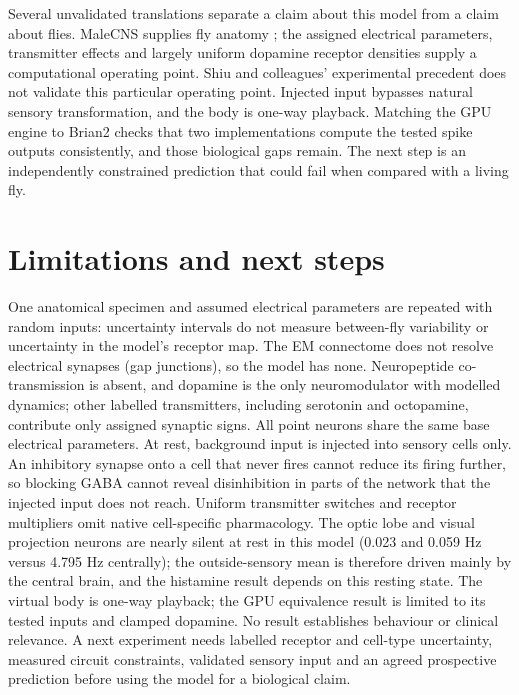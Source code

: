 \documentclass[11pt]{article}
\begin{document}
Several unvalidated translations separate a claim about this model from a claim about flies. MaleCNS supplies fly anatomy \cite{berg}; the assigned electrical parameters, transmitter effects and largely uniform dopamine receptor densities supply a computational operating point. Shiu and colleagues' experimental precedent \cite{shiu} does not validate this particular operating point. Injected input bypasses natural sensory transformation, and the body is one-way playback. Matching the GPU engine to Brian2 checks that two implementations compute the tested spike outputs consistently, and those biological gaps remain. The next step is an independently constrained prediction that could fail when compared with a living fly.

\section*{Limitations and next steps}
One anatomical specimen and assumed electrical parameters are repeated with random inputs: uncertainty intervals do not measure between-fly variability or uncertainty in the model's receptor map. The EM connectome does not resolve electrical synapses (gap junctions), so the model has none. Neuropeptide co-transmission is absent, and dopamine is the only neuromodulator with modelled dynamics; other labelled transmitters, including serotonin and octopamine, contribute only assigned synaptic signs. All point neurons share the same base electrical parameters. At rest, background input is injected into sensory cells only. An inhibitory synapse onto a cell that never fires cannot reduce its firing further, so blocking GABA cannot reveal disinhibition in parts of the network that the injected input does not reach. Uniform transmitter switches and receptor multipliers omit native cell-specific pharmacology. The optic lobe and visual projection neurons are nearly silent at rest in this model (0.023 and 0.059 Hz versus 4.795 Hz centrally); the outside-sensory mean is therefore driven mainly by the central brain, and the histamine result depends on this resting state. The virtual body is one-way playback; the GPU equivalence result is limited to its tested inputs and clamped dopamine. No result establishes behaviour or clinical relevance. A next experiment needs labelled receptor and cell-type uncertainty, measured circuit constraints, validated sensory input and an agreed prospective prediction before using the model for a biological claim.
\end{document}
